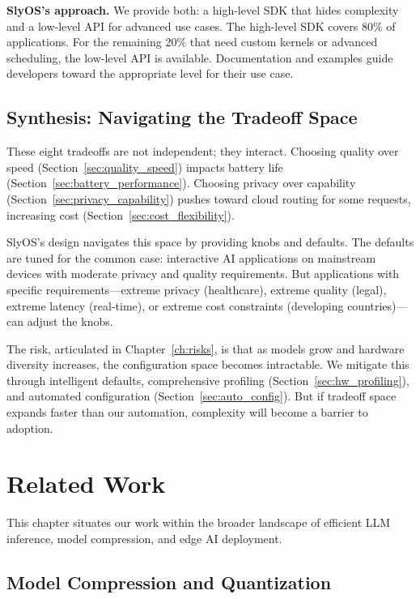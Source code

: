 \documentclass[12pt, letterpaper, twoside]{report}
\begin{document}
\textbf{SlyOS's approach.} We provide both: a high-level SDK that hides complexity and a low-level API for advanced use cases. The high-level SDK covers 80\% of applications. For the remaining 20\% that need custom kernels or advanced scheduling, the low-level API is available. Documentation and examples guide developers toward the appropriate level for their use case.

\section{Synthesis: Navigating the Tradeoff Space}
\label{sec:tradeoff_synthesis}

These eight tradeoffs are not independent; they interact. Choosing quality over speed (Section~\ref{sec:quality_speed}) impacts battery life (Section~\ref{sec:battery_performance}). Choosing privacy over capability (Section~\ref{sec:privacy_capability}) pushes toward cloud routing for some requests, increasing cost (Section~\ref{sec:cost_flexibility}).

SlyOS's design navigates this space by providing knobs and defaults. The defaults are tuned for the common case: interactive AI applications on mainstream devices with moderate privacy and quality requirements. But applications with specific requirements---extreme privacy (healthcare), extreme quality (legal), extreme latency (real-time), or extreme cost constraints (developing countries)---can adjust the knobs.

The risk, articulated in Chapter~\ref{ch:risks}, is that as models grow and hardware diversity increases, the configuration space becomes intractable. We mitigate this through intelligent defaults, comprehensive profiling (Section~\ref{sec:hw_profiling}), and automated configuration (Section~\ref{sec:auto_config}). But if tradeoff space expands faster than our automation, complexity will become a barrier to adoption.

\chapter{Related Work}
\label{ch:related}

This chapter situates our work within the broader landscape of efficient LLM inference, model compression, and edge AI deployment.

\section{Model Compression and Quantization}
\label{sec:related_compression}
\end{document}
